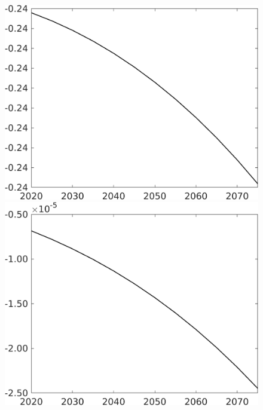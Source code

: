 \begin{figure}[h!!]
\begin{minipage}[]{0.32\textwidth}
	\end{minipage}
	\begin{minipage}[]{0.32\textwidth}
		\includegraphics[width=1\textwidth]{../../codding_model/own_basedOnFried/optimalPol_010922_revision/figures/all_13Sept22/CompTaufPER_bytaul_Reg0_sgsff_spillover0_nsk0_xgr0_knspil0_sep0_LFlimit0_emsbase0_countec0_GovRev0_etaa0.79_lgd0.png}
	\end{minipage}
	\begin{minipage}[]{0.32\textwidth}
		\includegraphics[width=1\textwidth]{../../codding_model/own_basedOnFried/optimalPol_010922_revision/figures/all_13Sept22/CompTaufPER_bytaul_Reg0_snS_spillover0_nsk0_xgr0_knspil0_sep0_LFlimit0_emsbase0_countec0_GovRev0_etaa0.79_lgd0.png}

\end{minipage}
\end{figure}

